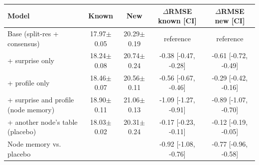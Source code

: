 \begin{tabular}{|p{5.4cm}|c|c|c|c|}
\hline
Model & Known & New & $\Delta$RMSE known [CI] & $\Delta$RMSE new [CI] \\
\hline
Base (split-res + consensus) & 17.97$\pm$0.05 & 20.29$\pm$0.19 & reference & reference \\
+ surprise only & 18.24$\pm$0.08 & 20.74$\pm$0.24 & -0.38 [-0.47, -0.28] & -0.61 [-0.72, -0.49] \\
+ profile only & 18.46$\pm$0.07 & 20.56$\pm$0.11 & -0.56 [-0.67, -0.46] & -0.29 [-0.42, -0.16] \\
+ surprise and profile (node memory) & 18.90$\pm$0.11 & 21.06$\pm$0.13 & -1.09 [-1.27, -0.91] & -0.89 [-1.07, -0.70] \\
+ another node's table (placebo) & 18.03$\pm$0.02 & 20.31$\pm$0.24 & -0.17 [-0.23, -0.11] & -0.12 [-0.19, -0.05] \\
Node memory vs. placebo & & & -0.92 [-1.08, -0.76] & -0.77 [-0.96, -0.58] \\
\hline
\end{tabular}
